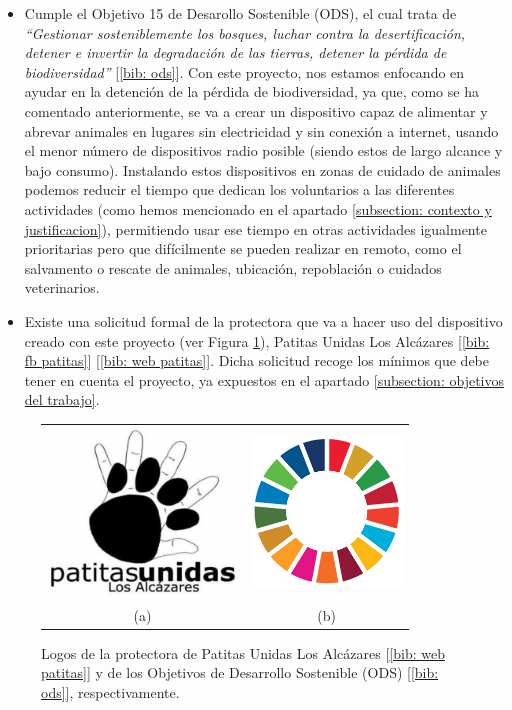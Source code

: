 \documentclass[12pt]{article}
\begin{document}
	\begin{itemize}
		\item Cumple el Objetivo 15 de Desarollo Sostenible (ODS), el cual trata de \textit{``Gestionar sosteniblemente los bosques, luchar contra la desertificación, detener e invertir la degradación de las tierras, detener la pérdida de biodiversidad''} [\ref{bib: ods}]. Con este proyecto, nos estamos enfocando en ayudar en la detención de la pérdida de biodiversidad, ya que, como se ha comentado anteriormente, se va a crear un dispositivo capaz de alimentar y abrevar animales en lugares sin electricidad y sin conexión a internet, usando el menor número de dispositivos radio posible (siendo estos de largo alcance y bajo consumo). Instalando estos dispositivos en zonas de cuidado de animales podemos reducir el tiempo que dedican los voluntarios a las diferentes actividades (como hemos mencionado en el apartado \ref{subsection: contexto y justificacion}), permitiendo usar ese tiempo en otras actividades igualmente prioritarias pero que difícilmente se pueden realizar en remoto, como el salvamento o rescate de animales, ubicación, repoblación o cuidados veterinarios. 
		\item Existe una solicitud formal de la protectora que va a hacer uso del dispositivo creado con este proyecto (ver Figura \ref{fig: estado del arte logos}), Patitas Unidas Los Alcázares [\ref{bib: fb patitas}] [\ref{bib: web patitas}]. Dicha solicitud recoge los mínimos que debe tener en cuenta el proyecto, ya expuestos en el apartado \ref{subsection: objetivos del trabajo}.
	\end{itemize}
	
	\begin{figure} [h!]
		\begin{center}
			\begin{tabular}{cc}
				\includegraphics[width=50mm]{img/patitas_logo.jpg} &   \includegraphics[width=40mm]{img/ODS_logo.png} \\
				(a)  & (b) \\ [10pt]
			\end{tabular}
			\caption{Logos de la protectora de Patitas Unidas Los Alcázares [\ref{bib: web patitas}] y de los Objetivos de Desarrollo Sostenible (ODS) [\ref{bib: ods}], respectivamente.}
			\label{fig: estado del arte logos}
		\end{center}
	\end{figure}
\end{document}
